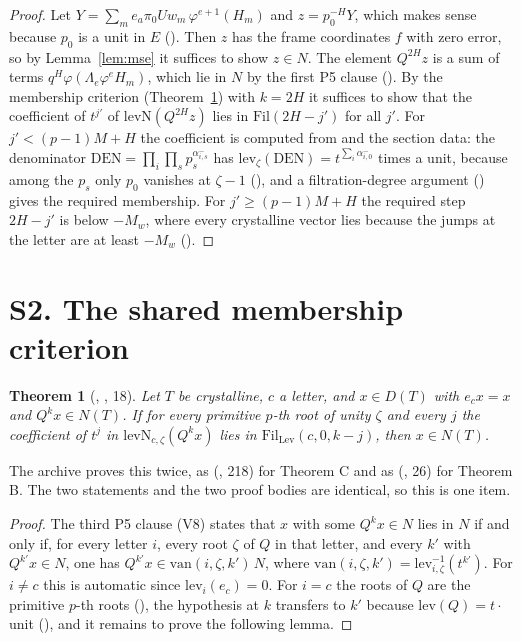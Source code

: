 \documentclass[11pt]{article}
\newcommand{\Fil}{\mathrm{Fil}}
\newtheorem{thm}[lemma]{Theorem}
\theoremstyle{definition}
\theoremstyle{remark}
\begin{document}
\begin{proof}
Let $Y=\sum_m e_a\pi_0Uw_m\,\varphi^{e+1}(H_m)$ and $z=p_0^{-H}Y$, which makes sense because $p_0$ is a unit in $E$ (). Then $z$ has the frame coordinates $f$ with zero error, so by Lemma~\ref{lem:mse} it suffices to show $z\in N$. The element $Q^{2H}z$ is a sum of terms $q^H\varphi(\Lambda_e\varphi^e H_m)$, which lie in $N$ by the first P5 clause (). By the membership criterion (Theorem~\ref{thm:memcrit}) with $k=2H$ it suffices to show that the coefficient of $t^{j'}$ of $\mathrm{levN}(Q^{2H}z)$ lies in $\Fil(2H-j')$ for all $j'$. For $j'<(p-1)M+H$ the coefficient is computed from  and the section data: the denominator $\mathrm{DEN}=\prod_i\prod_sp_s^{\alpha_{i,s}^-}$ has $\mathrm{lev}_\zeta(\mathrm{DEN})=t^{\sum_i\alpha_{i,0}^-}$ times a unit, because among the $p_s$ only $p_0$ vanishes at $\zeta-1$ (), and a filtration-degree argument () gives the required membership. For $j'\ge(p-1)M+H$ the required step $2H-j'$ is below $-M_w$, where every crystalline vector lies because the jumps at the letter are at least $-M_w$ ().
\end{proof}

\section{S2. The shared membership criterion}\label{sec:memcrit}

\begin{thm}[, , 18]\label{thm:memcrit}
Let $T$ be crystalline, $c$ a letter, and $x\in D(T)$ with $e_cx=x$ and $Q^kx\in N(T)$. If for every primitive $p$-th root of unity $\zeta$ and every $j$ the coefficient of $t^{j}$ in $\mathrm{levN}_{c,\zeta}(Q^kx)$ lies in $\Fil_{\mathrm{Lev}}(c,0,k-j)$, then $x\in N(T)$.
\end{thm}

The archive proves this twice, as  (, 218) for Theorem C and as  (, 26) for Theorem B. The two statements and the two proof bodies are identical, so this is one item.

\begin{proof}
The third P5 clause (V8) states that $x$ with some $Q^kx\in N$ lies in $N$ if and only if, for every letter $i$, every root $\zeta$ of $Q$ in that letter, and every $k'$ with $Q^{k'}x\in N$, one has $Q^{k'}x\in\mathrm{van}(i,\zeta,k')\,N$, where $\mathrm{van}(i,\zeta,k')=\mathrm{lev}_{i,\zeta}^{-1}(t^{k'})$. For $i\ne c$ this is automatic since $\mathrm{lev}_{i}(e_c)=0$. For $i=c$ the roots of $Q$ are the primitive $p$-th roots (), the hypothesis at $k$ transfers to $k'$ because $\mathrm{lev}(Q)=t\cdot$unit (), and it remains to prove the following lemma.
\end{proof}
\end{document}
